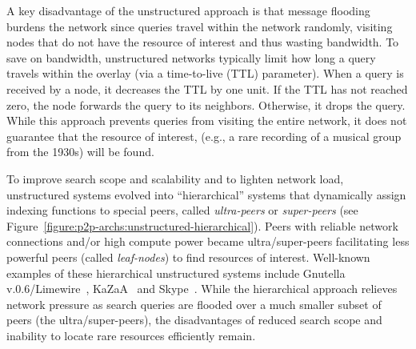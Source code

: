 A key disadvantage of the unstructured approach is that message flooding burdens
the network since queries travel within the network randomly, visiting nodes
that do not have the resource of interest and thus wasting bandwidth.  To save
on bandwidth, unstructured networks typically limit how long a query travels
within the overlay (via a time-to-live (TTL) parameter). When a query is
received by a node, it decreases the TTL by one unit. If the TTL has not reached
zero, the node forwards the query to its neighbors.  Otherwise, it drops the
query. While this approach prevents queries from visiting the entire network, it
does not guarantee that the resource of interest, (e.g., a rare recording 
of a musical group from the 1930s) will be found.

To improve search scope and scalability and to lighten network load, 
unstructured systems evolved into ``hierarchical'' systems that dynamically
assign indexing functions to special peers, called \emph{ultra-peers}  or
\emph{super-peers} (see
Figure~\ref{figure:p2p-archs:unstructured-hierarchical}). Peers with reliable
network connections and/or high compute power became ultra/super-peers
facilitating less powerful peers (called \emph{leaf-nodes}) to find resources of
interest. Well-known examples of these hierarchical unstructured systems include
Gnutella v.0.6/Limewire~\cite{gnutella}, KaZaA~\cite{kazaa} and
Skype~\cite{skype}. While the hierarchical approach relieves network pressure as
search queries are flooded over a much smaller subset of peers (the
ultra/super-peers), the disadvantages of reduced search scope and inability to
locate rare resources efficiently remain.

